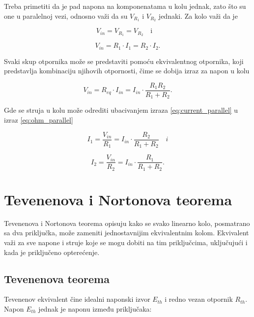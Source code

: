 \documentclass[12pt]{article}
\begin{document}
{Treba primetiti da je pad napona na komponenatama u kolu jednak, zato što su one u paralelnoj vezi,
odnosno važi da su $V_{R_1}$ i $V_{R_2}$ jednaki. Za kolo važi da je}

\begin{equation}
    V_{in} = V_{R_1} = V_{R_2} \quad \text{i} \quad
\end{equation}

\begin{equation}
    V_{in} = R_1 \cdot I_1 = R_2 \cdot I_2.
    \label{eq:ohm_parallel}
\end{equation}

{Svaki skup otpornika može se predstaviti pomoću ekvivalentnog otpornika,
koji predstavlja kombinaciju njihovih otpornosti, čime se dobija izraz za napon u kolu}

\begin{equation}
    V_{in} = R_{eq} \cdot I_{in} = I_{in} \cdot \frac{R_1 R_2}{R_1 + R_2}.
    \label{eq:current_parallel}
\end{equation}

{Gde se struja u kolu može odrediti ubacivanjem izraza \ref{eq:current_parallel} u izraz \ref{eq:ohm_parallel}}

\begin{equation}
    I_1 = \frac{V_{in}}{R_1} = I_{in} \cdot \frac{R_2}{R_1 + R_2} \quad i
\end{equation}

\begin{equation}
    I_2 = \frac{V_{in}}{R_2} = I_{in} \cdot \frac{R_1}{R_1 + R_2}.
\end{equation}

\pagebreak
\section{Tevenenova i Nortonova teorema}

Tevenenova i Nortonova teorema opisuju kako se svako linearno kolo, posmatrano sa dva priključka, može zameniti jednostavnijim ekvivalentnim kolom. Ekvivalent važi za sve napone i struje koje se mogu dobiti na tim priključcima, uključujući i kada je priključeno opterećenje.

\subsection{Tevenenova teorema}

Tevenenov ekvivalent čine idealni naponski izvor $E_{th}$ i redno vezan otpornik $R_{th}$. Napon $E_{th}$ jednak je naponu između priključaka:
\end{document}
